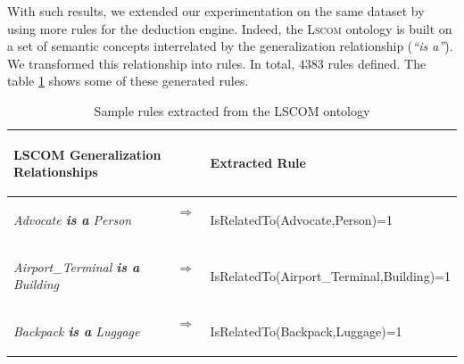 		With such results, we extended our experimentation on the same dataset by using more rules 
		for the deduction engine. Indeed, the \textsc{Lscom} ontology is built on a set of semantic concepts
		interrelated by the generalization relationship (\textit{``is a''}). We transformed this 
		relationship into rules. In total, $4383$ rules  defined. The table \ref{tablscom} 
		shows some of these generated rules.

			\begin{table}
				\centering	
				\caption{Sample rules extracted from the LSCOM ontology}
				\label{tablscom}
				\begin{tabular}{lcl} 
					
					\begin{small}\begin{sffamily}LSCOM Generalization Relationships\end{sffamily} 
					\end{small}& &
					\begin{small}\begin{sffamily}Extracted Rule\end{sffamily}\end{small} \\
					\hline
					\begin{small}\textit{Advocate \textbf{is a} Person} \end{small} & $\Longrightarrow$~~ &
						\begin{small}{\sffamily IsRelatedTo}(Advocate,Person)=1\end{small} \\
					\begin{small}\textit{Airport\_Terminal \textbf{is a} Building} \end{small} &  $\Longrightarrow$~~ &
						\begin{small}{\sffamily IsRelatedTo}(Airport\_Terminal,Building)=1\end{small} \\
					\begin{small}\textit{Backpack \textbf{is a} Luggage} \end{small} &  $\Longrightarrow$~~ &
						\begin{small}{\sffamily IsRelatedTo}(Backpack,Luggage)=1\end{small} \\
							
					\hline 
				\end{tabular}
			\end{table}
		

